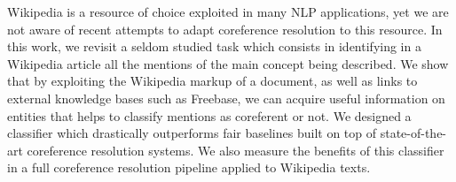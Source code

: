 Wikipedia is a resource of choice exploited in many NLP applications, yet we are not aware of recent attempts to adapt coreference resolution to this resource. In this work, we revisit a seldom studied task which consists in identifying in a Wikipedia article all the mentions of the main concept being described.  We show that by exploiting the Wikipedia markup of a document, as well as links to external knowledge bases such as Freebase, we can  acquire useful information on entities that helps to classify mentions as coreferent or not. We designed a classifier which drastically outperforms fair baselines built on top of state-of-the-art coreference resolution systems. We also measure the benefits of this classifier in a full coreference resolution pipeline applied to Wikipedia texts.

